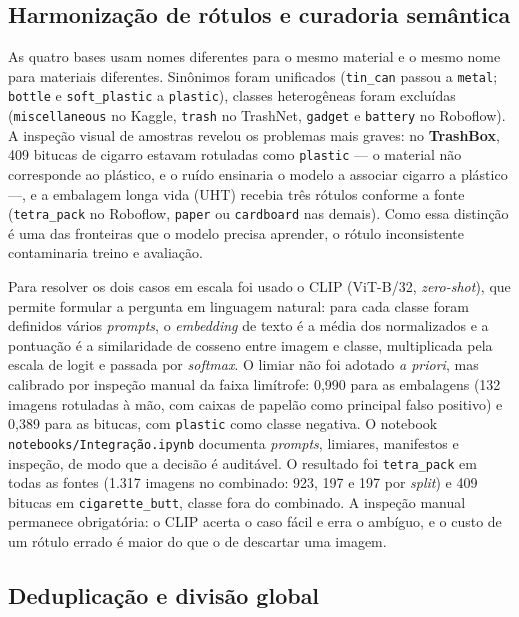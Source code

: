 \documentclass[11pt,a4paper]{article}
\begin{document}
		
	\subsection{Harmonização de rótulos e curadoria semântica}
	
	As quatro bases usam nomes diferentes para o mesmo material e o mesmo nome para materiais diferentes. Sinônimos foram unificados (\texttt{tin\_can} passou a \texttt{metal}; \texttt{bottle} e \texttt{soft\_plastic} a \texttt{plastic}), classes heterogêneas foram excluídas (\texttt{miscellaneous} no Kaggle, \texttt{trash} no TrashNet, \texttt{gadget} e \texttt{battery} no Roboflow). A inspeção visual de amostras revelou os problemas mais graves: no \textbf{TrashBox}, 409 bitucas de cigarro estavam rotuladas como \texttt{plastic} --- o material não corresponde ao plástico, e o ruído ensinaria o modelo a associar cigarro a plástico ---, e a embalagem longa vida (UHT) recebia três rótulos conforme a fonte (\texttt{tetra\_pack} no Roboflow, \texttt{paper} ou \texttt{cardboard} nas demais). Como essa distinção é uma das fronteiras que o modelo precisa aprender, o rótulo inconsistente contaminaria treino e avaliação.
	
	Para resolver os dois casos em escala foi usado o CLIP \cite{radford2021} (ViT-B/32, \textit{zero-shot}), que permite formular a pergunta em linguagem natural: para cada classe foram definidos vários \emph{prompts}, o \emph{embedding} de texto é a média dos normalizados e a pontuação é a similaridade de cosseno entre imagem e classe, multiplicada pela escala de logit e passada por \emph{softmax}. O limiar não foi adotado \emph{a priori}, mas calibrado por inspeção manual da faixa limítrofe: 0,990 para as embalagens (132 imagens rotuladas à mão, com caixas de papelão como principal falso positivo) e 0,389 para as bitucas, com \texttt{plastic} como classe negativa. O notebook \texttt{notebooks/\allowbreak Integração.ipynb} documenta \emph{prompts}, limiares, manifestos e inspeção, de modo que a decisão é auditável. O resultado foi \texttt{tetra\_pack} em todas as fontes (1.317 imagens no combinado: 923, 197 e 197 por \textit{split}) e 409 bitucas em \texttt{cigarette\_butt}, classe fora do combinado. A inspeção manual permanece obrigatória: o CLIP acerta o caso fácil e erra o ambíguo, e o custo de um rótulo errado é maior do que o de descartar uma imagem.
	
	\subsection{Deduplicação e divisão global}
	
\end{document}
